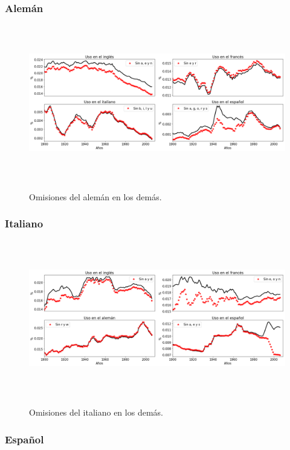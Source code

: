 \newpage
\subsubsection*{Alemán}

\begin{figure}[h!]
	\centering
	\includegraphics[width=14.5cm, height=6.8cm]{Cap_5/OM_GE.png}
	\label{fig.OM_GE}
	\caption{Omisiones del alemán en los demás.}
\end{figure}


\subsubsection*{Italiano}

\begin{figure}[h!]
	\centering
	\includegraphics[width=14.5cm, height=6.8cm]{Cap_5/OM_IT.png}
	\label{fig.OM_IT}
	\caption{Omisiones del italiano en los demás.}
\end{figure}

\newpage
\subsubsection*{Español}

